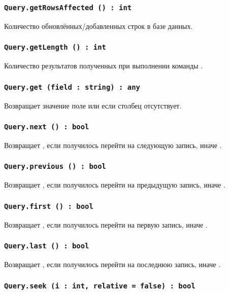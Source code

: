 \subsubsection{\lstinline|Query.getRowsAffected () : int|}

Количество обновлённых/добавленных строк в базе данных.

\subsubsection{\lstinline|Query.getLength () : int|}

Количество результатов полученных при выполнении команды .

\subsubsection{\lstinline|Query.get (field : string) : any|}

Возвращает значение поле или \void{} если столбец  отсутствует.

\subsubsection{\lstinline|Query.next () : bool|}

Возвращает \true, если получилось перейти на следующую запись, иначе \false.

\subsubsection{\lstinline|Query.previous () : bool|}

Возвращает \true, если получилось перейти на предыдущую запись, иначе \false.

\subsubsection{\lstinline|Query.first () : bool|}

Возвращает \true, если получилось перейти на первую запись, иначе \false.

\subsubsection{\lstinline|Query.last () : bool|}

Возвращает \true, если получилось перейти на последнюю запись, иначе \false.

\subsubsection{\lstinline|Query.seek (i : int, relative = false) : bool|}


